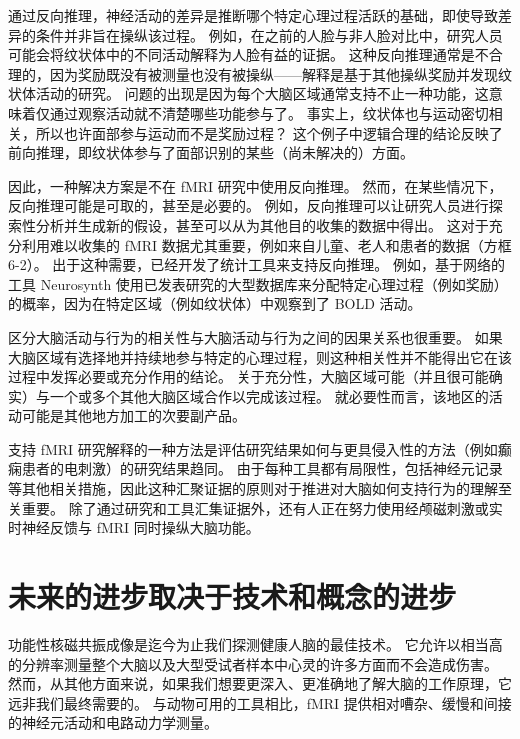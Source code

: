 通过反向推理，神经活动的差异是推断哪个特定心理过程活跃的基础，即使导致差异的条件并非旨在操纵该过程。 
例如，在之前的人脸与非人脸对比中，研究人员可能会将纹状体中的不同活动解释为人脸有益的证据。 
这种反向推理通常是不合理的，因为奖励既没有被测量也没有被操纵——解释是基于其他操纵奖励并发现纹状体活动的研究。 
问题的出现是因为每个大脑区域通常支持不止一种功能，这意味着仅通过观察活动就不清楚哪些功能参与了。 
事实上，纹状体也与运动密切相关，所以也许面部参与运动而不是奖励过程？ 
这个例子中逻辑合理的结论反映了前向推理，即纹状体参与了面部识别的某些（尚未解决的）方面。


因此，一种解决方案是不在 fMRI 研究中使用反向推理。 
然而，在某些情况下，反向推理可能是可取的，甚至是必要的。 
例如，反向推理可以让研究人员进行探索性分析并生成新的假设，甚至可以从为其他目的收集的数据中得出。 
这对于充分利用难以收集的 fMRI 数据尤其重要，例如来自儿童、老人和患者的数据（方框 6-2）。 
出于这种需要，已经开发了统计工具来支持反向推理。 
例如，基于网络的工具 Neurosynth 使用已发表研究的大型数据库来分配特定心理过程（例如奖励）的概率，因为在特定区域（例如纹状体）中观察到了 BOLD 活动。


区分大脑活动与行为的相关性与大脑活动与行为之间的因果关系也很重要。 
如果大脑区域有选择地并持续地参与特定的心理过程，则这种相关性并不能得出它在该过程中发挥必要或充分作用的结论。 
关于充分性，大脑区域可能（并且很可能确实）与一个或多个其他大脑区域合作以完成该过程。 
就必要性而言，该地区的活动可能是其他地方加工的次要副产品。


支持 fMRI 研究解释的一种方法是评估研究结果如何与更具侵入性的方法（例如癫痫患者的电刺激）的研究结果趋同。 
由于每种工具都有局限性，包括神经元记录等其他相关措施，因此这种汇聚证据的原则对于推进对大脑如何支持行为的理解至关重要。 
除了通过研究和工具汇集证据外，还有人正在努力使用经颅磁刺激或实时神经反馈与 fMRI 同时操纵大脑功能。




\section{未来的进步取决于技术和概念的进步}

功能性核磁共振成像是迄今为止我们探测健康人脑的最佳技术。 
它允许以相当高的分辨率测量整个大脑以及大型受试者样本中心灵的许多方面而不会造成伤害。 
然而，从其他方面来说，如果我们想要更深入、更准确地了解大脑的工作原理，它远非我们最终需要的。 
与动物可用的工具相比，fMRI 提供相对嘈杂、缓慢和间接的神经元活动和电路动力学测量。


